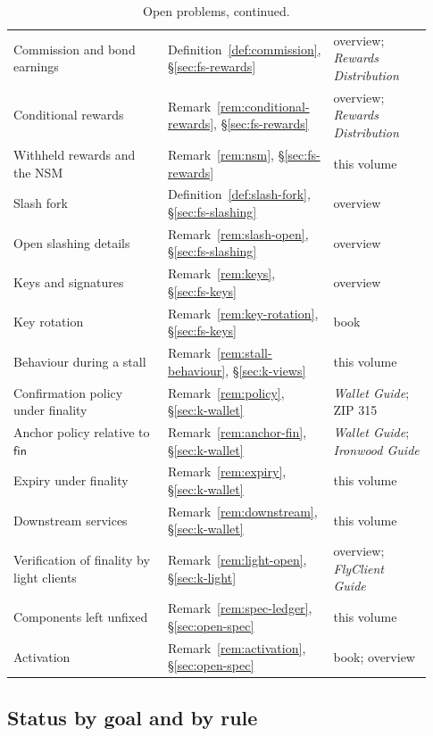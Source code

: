 \documentclass[11pt,a4paper]{article}
\theoremstyle{definition}
\newcommand{\fin}{\mathsf{fin}}
\begin{document}
\begin{table}[p]
\begin{tabular}{@{}p{0.42\linewidth}p{0.26\linewidth}p{0.25\linewidth}@{}}
Commission and bond earnings
  & Definition~\ref{def:commission}, \S\ref{sec:fs-rewards}
  & overview; \emph{Rewards Distribution} \\
Conditional rewards
  & Remark~\ref{rem:conditional-rewards}, \S\ref{sec:fs-rewards}
  & overview; \emph{Rewards Distribution} \\
Withheld rewards and the NSM
  & Remark~\ref{rem:nsm}, \S\ref{sec:fs-rewards} & this volume \\
Slash fork & Definition~\ref{def:slash-fork}, \S\ref{sec:fs-slashing}
  & overview \\
Open slashing details
  & Remark~\ref{rem:slash-open}, \S\ref{sec:fs-slashing} & overview \\
Keys and signatures & Remark~\ref{rem:keys}, \S\ref{sec:fs-keys} & overview \\
Key rotation & Remark~\ref{rem:key-rotation}, \S\ref{sec:fs-keys} & book \\
Behaviour during a stall
  & Remark~\ref{rem:stall-behaviour}, \S\ref{sec:k-views} & this volume \\
Confirmation policy under finality
  & Remark~\ref{rem:policy}, \S\ref{sec:k-wallet}
  & \emph{Wallet Guide}; ZIP 315 \\
Anchor policy relative to $\fin$
  & Remark~\ref{rem:anchor-fin}, \S\ref{sec:k-wallet}
  & \emph{Wallet Guide}; \emph{Ironwood Guide} \\
Expiry under finality
  & Remark~\ref{rem:expiry}, \S\ref{sec:k-wallet} & this volume \\
Downstream services
  & Remark~\ref{rem:downstream}, \S\ref{sec:k-wallet} & this volume \\
Verification of finality by light clients
  & Remark~\ref{rem:light-open}, \S\ref{sec:k-light}
  & overview; \emph{FlyClient Guide} \\
Components left unfixed
  & Remark~\ref{rem:spec-ledger}, \S\ref{sec:open-spec} & this volume \\
Activation & Remark~\ref{rem:activation}, \S\ref{sec:open-spec}
  & book; overview \\
\bottomrule
\end{tabular}
\caption[]{Open problems, continued.}
\end{table}

\subsection{Status by goal and by rule}\label{sec:open-status}
\end{document}
